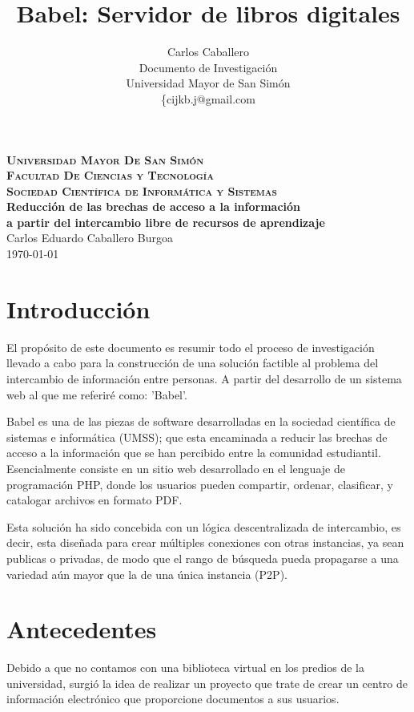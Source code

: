 \documentclass[letter,11pt,oneside,spanish]{article}
\title{\textbf{Babel: Servidor de libros digitales}}
\author{Carlos Caballero\\
Documento de Investigación\\
Universidad Mayor de San Simón\\
\{cijkb.j@gmail.com\\}
\date{}
\begin{document}
\begin{titlepage}
\thispagestyle{empty}
\begin{center}
\large{\textsc{\bf Universidad Mayor De San Simón}}\\
\large{\textsc{\bf Facultad De Ciencias y Tecnología}}\\
\large{\textsc{\bf Sociedad Científica de Informática y Sistemas}}\\
\vspace{4.0cm}
\large{\bf Reducción de las brechas de acceso a la información\\
a partir del intercambio libre de recursos de aprendizaje}\\
\vspace{1.0cm}
\small{Carlos Eduardo Caballero Burgoa}
~\\
\small{\today}
\end{center}
\end{titlepage}

\newpage
\tableofcontents

\newpage
\section{Introducción}
El propósito de este documento es resumir todo el proceso de investigación
llevado a cabo para la construcción de una solución factible al problema del
intercambio de información entre personas. A partir del desarrollo de un sistema
web al que me referiré como: 'Babel'.

Babel es una de las piezas de software desarrolladas en la sociedad científica
de sistemas e informática (UMSS); que esta encaminada a reducir las brechas de
acceso a la información que se han percibido entre la comunidad estudiantil.
Esencialmente consiste en un sitio web desarrollado en el lenguaje de
programación PHP, donde los usuarios pueden compartir, ordenar, clasificar, y
catalogar archivos en formato PDF.

Esta solución ha sido concebida con un lógica descentralizada de intercambio, es
decir, esta diseñada para crear múltiples conexiones con otras instancias, ya
sean publicas o privadas, de modo que el rango de búsqueda pueda propagarse a
una variedad aún mayor que la de una única instancia (P2P).

\section{Antecedentes}
Debido a que no contamos con una biblioteca virtual en los predios de la
universidad, surgió la idea de realizar un proyecto que trate de crear un centro
de información electrónico que proporcione documentos a sus usuarios.
\end{document}
